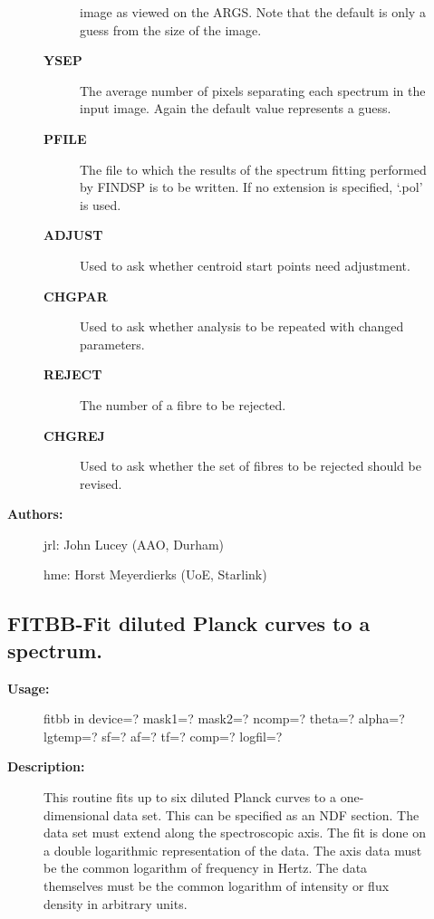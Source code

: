 \begin{description}
\begin{description}
\begin{description}
 image as viewed on the ARGS.  Note that the default is only a
 guess from the size of the image.
\item [\textbf{YSEP}]
 The average number of pixels separating each spectrum in the
 input image. Again the default value represents a guess.
\item [\textbf{PFILE}]
 The file to which the results of the spectrum fitting performed
 by FINDSP is to be written.  If no extension is specified,
 `.pol' is used.
\item [\textbf{ADJUST}]
 Used to ask whether centroid start points need adjustment.
\item [\textbf{CHGPAR}]
 Used to ask whether analysis to be repeated with changed
 parameters.
\item [\textbf{REJECT}]
 The number of a fibre to be rejected.
\item [\textbf{CHGREJ}]
 Used to ask whether the set of fibres to be rejected should be
 revised.
\end{description}

\item [\textbf{Authors:}]
 jrl: John Lucey (AAO, Durham)

 hme: Horst Meyerdierks (UoE, Starlink)
\end{description}
\subsection{FITBB-\label{FITBB}Fit diluted Planck curves to a spectrum.}
\begin{description}

\item [\textbf{Usage:}]

   fitbb in device=? mask1=? mask2=?
      ncomp=? theta=? alpha=? lgtemp=? sf=? af=? tf=?
      comp=? logfil=?


\item [\textbf{Description:}]
   This routine fits up to six diluted Planck curves to a
   one-dimensional data set. This can be specified as an NDF section.
   The data set must extend along the spectroscopic axis. The fit is
   done on a double logarithmic representation of the data. The axis
   data must be the common logarithm of frequency in Hertz. The data
   themselves must be the common logarithm of intensity or flux
   density in arbitrary units.



\end{description}
\end{description}
